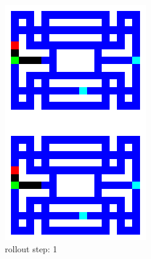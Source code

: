 \begin{figure}[H]
\begin{subfigure}[b]{0.16\textwidth}
        \includegraphics[width=\textwidth]{./Images/env_model_rollout_1.png}
  		\caption*{\footnotesize rollout step: 1} 
  		\label{fig:rollout_1}
    \end{subfigure} 
    \hspace{0mm}%
    \begin{subfigure}[b]{0.16\textwidth}

\end{subfigure}
\end{figure}
